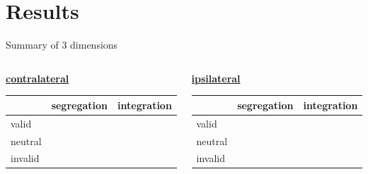 \section{Results}

 \frame{\sectionpage}

    \begin{frame}{Summary of 3 dimensions}

    \begin{columns}[T]

        \begin{column}{0.45\textwidth}
            \begin{center}
                \textcolor{lightlavender}{\textbf{\underline{contralateral}}}
            \end{center}
            \begin{table}[h!]
                \small
                \begin{center}
                  \begin{tabular}{l|c|c}
                    
                    & segregation & integration  \\
                    \hline
                    valid & & \\
                    \hline
                    neutral & & \\
                    \hline
                    invalid & &
                  \end{tabular}
                \end{center}
              \end{table}
            
        \end{column}

        \begin{column}{0.45\textwidth}
        \begin{center}
            \textcolor{lightlavender}{\textbf{\underline{ipsilateral}}}
        \end{center}
            \begin{table}[h!]
                \small
                \begin{center}
                  \begin{tabular}{l|c|c}
                    
                    & segregation & integration  \\
                    \hline
                    valid & & \\
                    \hline
                    neutral & & \\
                    \hline
                    invalid & &
                  \end{tabular}
                \end{center}
              \end{table}
            
        \end{column}

    \end{columns}   
        
    \end{frame}
    
